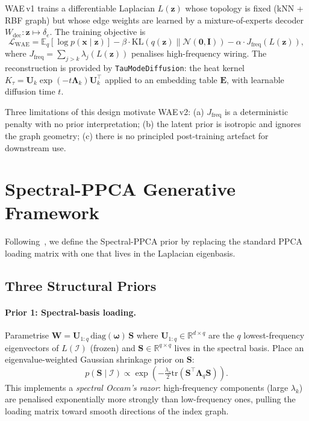 \documentclass[11pt,a4paper]{article}
\newcommand{\R}{\mathbb{R}}
\newcommand{\E}{\mathbb{E}}
\newcommand{\KL}{\mathrm{KL}}
\newcommand{\N}{\mathcal{N}}
\newcommand{\I}{\mathcal{I}}
\newcommand{\diag}{\mathrm{diag}}
\newcommand{\tr}{\mathrm{tr}}
\newcommand{\elbo}{\mathcal{L}}
\newcommand{\bLambda}{\bm{\Lambda}}
\newcommand{\bU}{\bm{U}}
\newcommand{\bS}{\bm{S}}
\newcommand{\bW}{\bm{W}}
\newcommand{\bz}{\bm{z}}
\newcommand{\bomega}{\bm{\omega}}
\newcommand{\bx}{\bm{x}}
\newcommand{\bE}{\bm{E}}
\begin{document}
WAE\,v1 trains a differentiable Laplacian $L(\bz)$ whose topology is fixed
(kNN + RBF graph) but whose edge weights are learned by a mixture-of-experts
decoder $W_{\mathrm{dec}}:\bz\mapsto\delta_e$.  The training objective is
\begin{equation}
  \elbo_{\mathrm{WAE}} =
    \E_q[\log p(\bx\mid\bz)] -
    \beta\cdot\KL(q(\bz)\|\N(\mathbf{0},\bm{I})) -
    \alpha\cdot J_{\mathrm{freq}}(L(\bz)),
  \label{eq:wae_v1}
\end{equation}
where $J_{\mathrm{freq}} = \sum_{j>k}\lambda_j(L(\bz))$ penalises
high-frequency wiring.  The reconstruction is provided by
\texttt{TauModeDiffusion}: the heat kernel
$K_\tau = \bU_k\exp(-t\bLambda_k)\bU_k^\top$ applied to an embedding table
$\bE$, with learnable diffusion time $t$.

Three limitations of this design motivate WAE\,v2:
(a) $J_{\mathrm{freq}}$ is a deterministic penalty with no prior interpretation;
(b) the latent prior is isotropic and ignores the graph geometry;
(c) there is no principled post-training artefact for downstream use.

\section{Spectral-PPCA Generative Framework}
\label{sec:spectral_ppca}

Following~\citet{design_a}, we define the Spectral-PPCA prior by replacing the
standard PPCA loading matrix with one that lives in the Laplacian eigenbasis.

\subsection{Three Structural Priors}

\paragraph{Prior 1: Spectral-basis loading.}
Parametrise $\bW = \bU_{1:q}\,\diag(\bomega)\,\bS$ where
$\bU_{1:q}\in\R^{d\times q}$ are the $q$ lowest-frequency eigenvectors of
$L(\I)$ (frozen) and $\bS\in\R^{q\times q}$ lives in the spectral basis.
Place an eigenvalue-weighted Gaussian shrinkage prior on $\bS$:
\begin{equation}
  p(\bS\mid\I) \propto
  \exp\!\left(-\tfrac{\lambda_s}{2}\tr(\bS^\top \bLambda_q \bS)\right).
  \label{eq:prior_S}
\end{equation}
This implements a \emph{spectral Occam's razor}: high-frequency components
(large $\lambda_k$) are penalised exponentially more strongly than low-frequency
ones, pulling the loading matrix toward smooth directions of the index graph.
\end{document}
